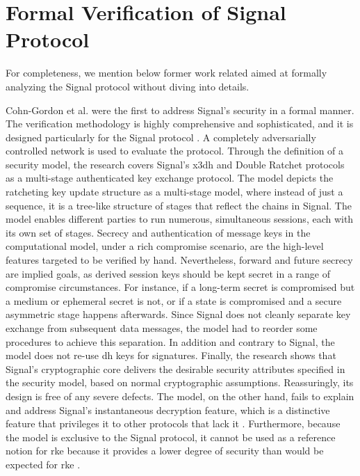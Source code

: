 \section{Formal Verification of Signal Protocol}
For completeness, we mention below former work related aimed at formally analyzing the Signal protocol without diving into details.
\par
Cohn-Gordon et al. \cite{cohn2020formal} were the first to address Signal's security in a formal manner. The verification methodology is highly comprehensive and sophisticated, and it is designed particularly for the Signal protocol \cite{alwen_coretti_dodis_2020}. A completely adversarially controlled network is used to evaluate the protocol. Through the definition of a security model, the research covers Signal's \gls{x3dh} and Double Ratchet protocols as a multi-stage authenticated key exchange protocol. The model depicts the ratcheting key update structure as a multi-stage model, where instead of just a sequence, it is a tree-like structure of stages that reflect the chains in Signal. The model enables different parties to run numerous, simultaneous sessions, each with its own set of stages. Secrecy and authentication of message keys in the computational model, under a rich compromise scenario, are the high-level features targeted to be verified by hand. Nevertheless, forward and future secrecy are implied goals, as derived session keys should be kept secret in a range of compromise circumstances. For instance, if a long-term secret is compromised but a medium or ephemeral secret is not, or if a state is compromised and a secure asymmetric stage happens afterwards. Since Signal does not cleanly separate key exchange from subsequent data messages, the model had to reorder some procedures to achieve this separation. In addition and contrary to Signal, the model does not re-use \gls{dh} keys for signatures. Finally, the research shows that Signal's cryptographic core delivers the desirable security attributes specified in the security model, based on normal cryptographic assumptions. Reassuringly, its design is free of any severe defects. The model, on the other hand, fails to explain and address Signal's instantaneous decryption feature, which is a distinctive feature that privileges it to other protocols that lack it \cite{alwen_coretti_dodis_2020}. Furthermore, because the model is exclusive to the Signal protocol, it cannot be used as a reference notion for \gls{rke} because it provides a lower degree of security than would be expected for \gls{rke} \cite{poettering2018asynchronous}.
\par


